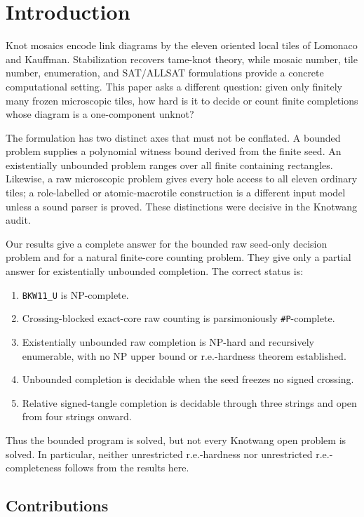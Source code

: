 \documentclass[11pt]{article}
\begin{document}
\section{Introduction}

Knot mosaics encode link diagrams by the eleven oriented local tiles of
Lomonaco and Kauffman.  Stabilization recovers tame-knot theory, while mosaic
number, tile number, enumeration, and SAT/ALLSAT formulations provide a
concrete computational setting.  This paper asks a different question: given
only finitely many frozen microscopic tiles, how hard is it to decide or count
finite completions whose diagram is a one-component unknot?

The formulation has two distinct axes that must not be conflated.  A bounded
problem supplies a polynomial witness bound derived from the finite seed.  An
existentially unbounded problem ranges over all finite containing rectangles.
Likewise, a raw microscopic problem gives every hole access to all eleven
ordinary tiles; a role-labelled or atomic-macrotile construction is a
different input model unless a sound parser is proved.  These distinctions
were decisive in the Knotwang audit.

Our results give a complete answer for the bounded raw seed-only decision
problem and for a natural finite-core counting problem.  They give only a
partial answer for existentially unbounded completion.  The correct status is:

\begin{enumerate}
\item \texttt{BKW11\_U} is NP-complete.
\item Crossing-blocked exact-core raw counting is parsimoniously \texttt{\#P}-complete.
\item Existentially unbounded raw completion is NP-hard and recursively
   enumerable, with no NP upper bound or r.e.-hardness theorem established.
\item Unbounded completion is decidable when the seed freezes no signed crossing.
\item Relative signed-tangle completion is decidable through three strings and
   open from four strings onward.
\end{enumerate}

Thus the bounded program is solved, but not every Knotwang open problem is
solved.  In particular, neither unrestricted r.e.-hardness nor unrestricted
r.e.-completeness follows from the results here.

\subsection{Contributions}
\end{document}

